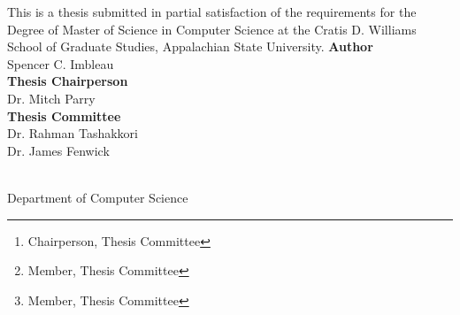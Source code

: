 \title{\thesistitle}
\author{Spencer C. Imbleau\\Dr. Mitch Parry\thanks{Chairperson, Thesis Committee} \\\and
Dr. Rahman Tashakkori\thanks{Member, Thesis Committee}\\Dr. James Fenwick\thanks{Member, Thesis Committee}}
\date{\today}

\vfill
\maketitle
\vfill

\clearpage

\vfill
\begin{center}
\title{\Large\thesistitle}
\vfill
This is a thesis submitted in partial satisfaction of the requirements for the Degree of Master of Science in Computer Science at the Cratis D. Williams School of Graduate Studies, Appalachian State University.
\vfill
\textbf{Author}\\
Spencer C. Imbleau\\
\medskip
\textbf{Thesis Chairperson}\\
Dr. Mitch Parry\\
\medskip
\textbf{Thesis Committee}\\
Dr. Rahman Tashakkori\\
Dr. James Fenwick
\vfill
\date{\today}\\
Department of Computer Science
\end{center}
\vfill %